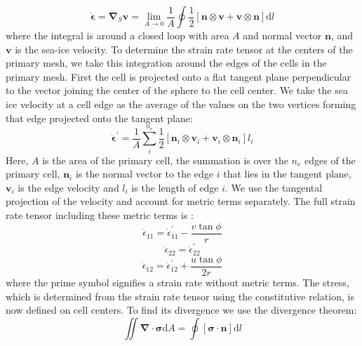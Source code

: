 \begin{equation}
\boldsymbol{\dot{\epsilon}} = \boldsymbol{\nabla}_S \boldsymbol{v} = \lim_{A \to 0} \frac{1}{A} \oint \frac{1}{2}\left[ \boldsymbol{n} \otimes \boldsymbol{v} + \boldsymbol{v} \otimes \boldsymbol{n} \right] \mathrm{d}l
\end{equation}
where the integral is around a closed loop with area $A$ and normal vector $\boldsymbol{n}$, and $\boldsymbol{v}$ is the sea-ice velocity.
To determine the strain rate tensor at the centers of the primary mesh, we take this integration around the edges of the cells in the primary mesh. First the cell is projected onto a flat tangent plane perpendicular to the vector joining the center of the sphere to the cell center. We take the sea ice velocity at a cell edge as the average of the values on the two vertices forming that edge projected onto the tangent plane:
\begin{equation}
\boldsymbol{\dot{\epsilon}}^\prime = \frac{1}{A} \sum_i^{n_e} \frac{1}{2} \left[ \boldsymbol{n}_i \otimes \boldsymbol{v}_i + \boldsymbol{v}_i \otimes \boldsymbol{n}_i \right] l_i
\end{equation}
Here, $A$ is the area of the primary cell, the summation is over the $n_e$ edges of the primary cell, $\boldsymbol{n}_i$ is the normal vector to the edge $i$ that lies in the tangent plane, $\boldsymbol{v}_i$ is the edge velocity and $l_i$ is the length of edge $i$. We use the tangental projection of the velocity and account for metric terms separately. The full strain rate tensor including these metric terms is \citep{Batchelor67}:
\begin{equation}
\dot{\epsilon}_{11} = \dot{\epsilon}_{11}^\prime - \frac{v \tan{\phi}}{r}
\end{equation}
\begin{equation}
\dot{\epsilon}_{22} = \dot{\epsilon}_{22}^\prime
\end{equation}
\begin{equation}
\dot{\epsilon}_{12} = \dot{\epsilon}_{12}^\prime + \frac{u \tan{\phi}}{2r}
\end{equation}
where the prime symbol signifies a strain rate without metric terms.
The stress, which is determined from the strain rate tensor using the constitutive relation, is now defined on cell centers. To find its divergence we use the divergence theorem:
\begin{equation}
\iint \boldsymbol{\nabla} \cdot \boldsymbol{\sigma} \mathrm{d}A = \oint \left[ \boldsymbol{\sigma} \cdot \boldsymbol{n} \right] \mathrm{d}l
\end{equation}
